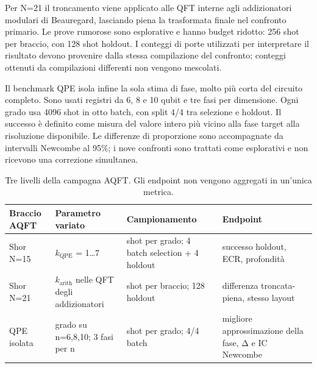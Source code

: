 Per N=21 il troncamento viene applicato alle QFT interne agli addizionatori modulari di Beauregard, lasciando piena la trasformata finale nel confronto primario. Le prove rumorose sono esplorative e hanno budget ridotto: 256 shot per braccio, con 128 shot holdout. I conteggi di porte utilizzati per interpretare il risultato devono provenire dalla stessa compilazione del confronto; conteggi ottenuti da compilazioni differenti non vengono mescolati.

Il benchmark QPE isola infine la sola stima di fase, molto più corta del circuito completo. Sono usati registri da 6, 8 e 10 qubit e tre fasi per dimensione. Ogni grado usa 4096 shot in otto batch, con split 4/4 tra selezione e holdout. Il successo è definito come misura del valore intero più vicino alla fase target alla risoluzione disponibile. Le differenze di proporzione sono accompagnate da intervalli Newcombe al 95\%; i nove confronti sono trattati come esplorativi e non ricevono una correzione simultanea.

\begingroup
\small
\begin{table}[!htbp]
\centering
\small

\begin{tabular}{@{}
  >{\raggedright\arraybackslash}p{}
  >{\raggedright\arraybackslash}p{}
  >{\raggedright\arraybackslash}p{}
  >{\raggedright\arraybackslash}p{}@{}}
\toprule
\textbf{Braccio AQFT} & \textbf{Parametro variato} & \textbf{Campionamento} & \textbf{Endpoint} \\
\midrule
Shor N=15 & $k_{\mathrm{QPE}}$ = 1\ldots7 & 8192 shot per grado; 4 batch selection + 4 holdout & successo holdout, ECR, profondità \\
\addlinespace[0.3em]
Shor N=21 & $k_{\mathrm{arith}}$ nelle QFT degli addizionatori & 256 shot per braccio; 128 holdout & differenza troncata-piena, stesso layout \\
\addlinespace[0.3em]
QPE isolata & grado su n=6,8,10; 3 fasi per n & 4096 shot per grado; 4/4 batch & migliore approssimazione della fase, Δ e IC Newcombe \\
\bottomrule
\end{tabular}
\caption{Tre livelli della campagna AQFT. Gli endpoint non vengono aggregati in un'unica metrica.}\label{tab:finale_3_9}

\end{table}
\endgroup

